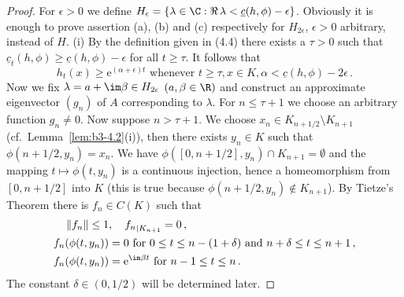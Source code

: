 \begin{proof}
	For $\epsilon > 0$ we define $H_{\epsilon} = \{\lambda \in \C : \Re\,\lambda  < \underline{c}(h,\phi)-\epsilon\}$.
	Obviously it is enough to prove assertion (a), (b) and (c) respectively for $H_{2\epsilon}$, $\epsilon> 0$ arbitrary, instead of $H$.
%
%
	(i) By the definition given in (4.4) there exists a $\tau > 0$ such that $\underline{c}_{t}(h,\phi) \geq \underline{c}(h,\phi) - \epsilon$ for all $t \geq \tau$.
	It follows that
	\begin{equation}\label{eq:b3-4.5}
		h_{t}(x) \geq \mathrm{e}^{(\alpha + \epsilon)t} \text{ whenever } t \geq \tau, x \in K, \alpha < \underline{c}(h,\phi)-2\epsilon \,.
	\end{equation}
	Now we fix $\lambda = a + \im\beta \in H_{2\epsilon}$ $(a,\beta \in \R)$ and construct an approximate eigenvector $(g_{n})$ of $A$ corresponding to $\lambda$.
	For $n \leq \tau + 1$ we choose an arbitrary function $g_{n} \neq 0$.
	Now suppose $n > \tau + 1$.
	We choose $x_{n} \in K_{n+1/2} \setminus K_{n+1}$ (cf.\ Lemma~\ref{lem:b3-4.2}(i)), then there exists $y_{n} \in K$ such that $\phi(n+1/2,y_{n}) = x_{n}$.
	We have $\phi([0,n+1/2],y_{n}) \cap K_{n+1} = \emptyset$ and the mapping $t \mapsto \phi(t,y_{n})$ is a continuous injection, hence a homeomorphism from $[0,n+1/2]$ into $K$ (this is true because $\phi(n+1/2,y_{n}) \notin K_{n+1}$).
	By Tietze's Theorem there is $f_{n} \in C(K)$ such that
	\begin{equation}\label{eq:b3-4.6}
		\begin{aligned}
			\|f_{n}\| \leq 1 &, \quad {f_{n}}_{|K_{n+1}} = 0\,, \\
			f_{n}(\phi(t,y_{n})) &= 0 \text{ for } 0 \leq t \leq n-(1+\delta) \text{ and } n+\delta \leq t \leq n+1\,, \\
			f_{n}(\phi(t,y_{n})) &= \mathrm{e}^{\im\beta  t} \text{ for } n-1 \leq t \leq n \,.
		\end{aligned}
	\end{equation}
	The constant $\delta \in (0,1/2)$ will be determined later.
	

\end{proof}
